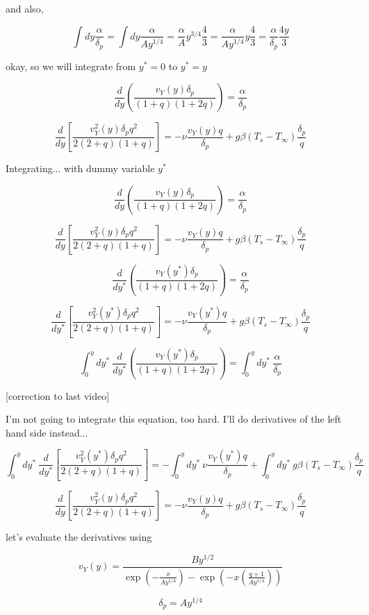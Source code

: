 \documentclass[11pt]{article}
\begin{document}
and also,

$$\int dy \frac{\alpha}{\delta_p} = \int dy \frac{\alpha}{A y^{1/4}} = \frac{\alpha}{A} y^{3/4} \frac{4}{3} =  \frac{\alpha}{A y^{1/4}} y  \frac{4}{3} = \frac{\alpha}{\delta_p} \frac{4y}{3} $$

okay, so we will integrate from $y^*=0$ to $y^*=y$


$$ \frac{d}{dy}  ( \frac{ v_Y (y) \delta_p}{(1 + q)(1+2q)}  ) =  \frac{\alpha}{\delta_p}$$


$$\frac{d}{dy} \left[  \frac{v_Y^2 (y) \delta_p q^2  }{2(2+q)(1+ q)} \right] = - \nu  \frac{ v_Y (y) q}{\delta_p} + g\beta  (T_s -T_\infty) \frac{\delta_p}{q}$$

Integrating... with dummy variable $y^*$


$$ \frac{d}{dy}  ( \frac{ v_Y (y) \delta_p}{(1 + q)(1+2q)}  ) =  \frac{\alpha}{\delta_p}$$


$$\frac{d}{dy} \left[  \frac{v_Y^2 (y) \delta_p q^2  }{2(2+q)(1+ q)} \right] = - \nu  \frac{ v_Y (y) q}{\delta_p} + g\beta  (T_s -T_\infty) \frac{\delta_p}{q}$$


$$ \frac{d}{dy^*}  ( \frac{ v_Y (y^*) \delta_p}{(1 + q)(1+2q)}  ) =  \frac{\alpha}{\delta_p}$$


$$\frac{d}{dy^*} \left[  \frac{v_Y^2 (y^*) \delta_p q^2  }{2(2+q)(1+ q)} \right] = - \nu  \frac{ v_Y (y^*) q}{\delta_p} + g\beta  (T_s -T_\infty) \frac{\delta_p}{q}$$



$$ \int_0^y dy^* \  \frac{d}{dy^*}  ( \frac{ v_Y (y^*) \delta_p}{(1 + q)(1+2q)}  ) =  \int_0^y dy^* \ \frac{\alpha}{\delta_p}$$

[correction to last video]

I'm not going to integrate this equation, too hard. I'll do derivatives of the left hand side instead...

$$\int_0^y dy^* \ \frac{d}{dy^*} \left[  \frac{v_Y^2 (y^*) \delta_p q^2  }{2(2+q)(1+ q)} \right] = -\int_0^y dy^* \  \nu  \frac{ v_Y (y^*) q}{\delta_p} + \int_0^y dy^* \  g\beta  (T_s -T_\infty) \frac{\delta_p}{q}$$

$$\frac{d}{dy} \left[  \frac{v_Y^2 (y) \delta_p q^2  }{2(2+q)(1+ q)} \right] = - \nu  \frac{ v_Y (y) q}{\delta_p} + g\beta  (T_s -T_\infty) \frac{\delta_p}{q}$$

let's evaluate the derivatives using

 $$v_Y (y) =  \frac{B y^{1/2} }{\exp (-\frac{x}{Ay^{1/4}})- \exp (-x (\frac{q+1}{Ay^{1/4}} ))}$$

$$\delta_p = Ay^{1/4}$$
\end{document}
